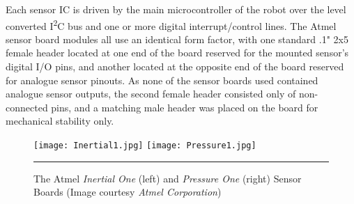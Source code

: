 Each sensor IC is driven by the main microcontroller of the robot over the level converted I\textsuperscript{2}C bus and one or more digital interrupt/control lines. The Atmel sensor board modules all use an identical form factor, with one standard .1" 2x5 female header located at one end of the board reserved for the mounted sensor's digital I/O pins, and another located at the opposite end of the board reserved for analogue sensor pinouts. As none of the sensor boards used contained analogue sensor outputs, the second female header consisted only of non-connected pins, and a matching male header was placed on the board for mechanical stability only.

\begin{figure}[tbph]
	\centering
		\texttt{[image: Inertial1.jpg]}
		\texttt{[image: Pressure1.jpg]}
	\rule{35em}{0.5pt}
	\caption[Atmel Sensor Boards]{The Atmel \emph{Inertial One} (left) and \emph{Pressure One} (right) Sensor Boards (Image courtesy \textit{Atmel Corporation})}
	\label{fig:atmelsensorboards}
\end{figure}

\FloatBarrier
